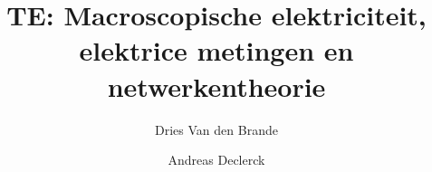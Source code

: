 \usepackage[dutch]{babel}
\usepackage{amsmath}

\title{TE: Macroscopische elektriciteit, elektrice metingen en netwerkentheorie}
\author{Dries Van den Brande \and Andreas Declerck}
